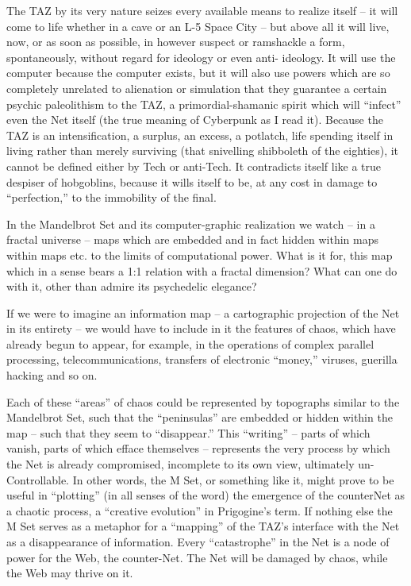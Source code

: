\documentclass[a4paper,english,10pt,twoside]{article}
\begin{document}
\medskip
The TAZ by its very nature seizes every available means to realize itself -- it will come to life whether in a cave or an L-5 Space City -- but above all it will live, now, or as soon as possible, in however suspect or ramshackle a form, spontaneously, without regard for ideology or even anti- ideology. It will use the computer because the computer exists, but it will also use powers which are so completely unrelated to alienation or simulation that they guarantee a certain psychic paleolithism to the TAZ, a primordial-shamanic spirit which will \enquote{infect} even the Net itself (the true meaning of Cyberpunk as I read it). Because the TAZ is an intensification, a surplus, an excess, a potlatch, life spending itself in living rather than merely surviving (that snivelling shibboleth of the eighties), it cannot be defined either by Tech or anti-Tech. It contradicts itself like a true despiser of hobgoblins, because it wills itself to be, at any cost in damage to \enquote{perfection,} to the immobility of the final.

\medskip
In the Mandelbrot Set and its computer-graphic realization we watch -- in a fractal universe -- maps which are embedded and in fact hidden within maps within maps etc. to the limits of computational power. What is it for, this map which in a sense bears a 1:1 relation with a fractal dimension? What can one do with it, other than admire its psychedelic elegance?

\medskip
If we were to imagine an information map -- a cartographic projection of the Net in its entirety -- we would have to include in it the features of chaos, which have already begun to appear, for example, in the operations of complex parallel processing, telecommunications, transfers of electronic \enquote{money,} viruses, guerilla hacking and so on.

\medskip
Each of these \enquote{areas} of chaos could be represented by topographs similar to the Mandelbrot Set, such that the \enquote{peninsulas} are embedded or hidden within the map -- such that they seem to \enquote{disappear.} This \enquote{writing} -- parts of which vanish, parts of which efface themselves -- represents the very process by which the Net is already compromised, incomplete to its own view, ultimately un-Controllable. In other words, the M Set, or something like it, might prove to be useful in \enquote{plotting} (in all senses of the word) the emergence of the counterNet as a chaotic process, a \enquote{creative evolution} in Prigogine's term. If nothing else the M Set serves as a metaphor for a \enquote{mapping} of the TAZ's interface with the Net as a disappearance of information. Every \enquote{catastrophe} in the Net is a node of power for the Web, the counter-Net. The Net will be damaged by chaos, while the Web may thrive on it.
\end{document}
